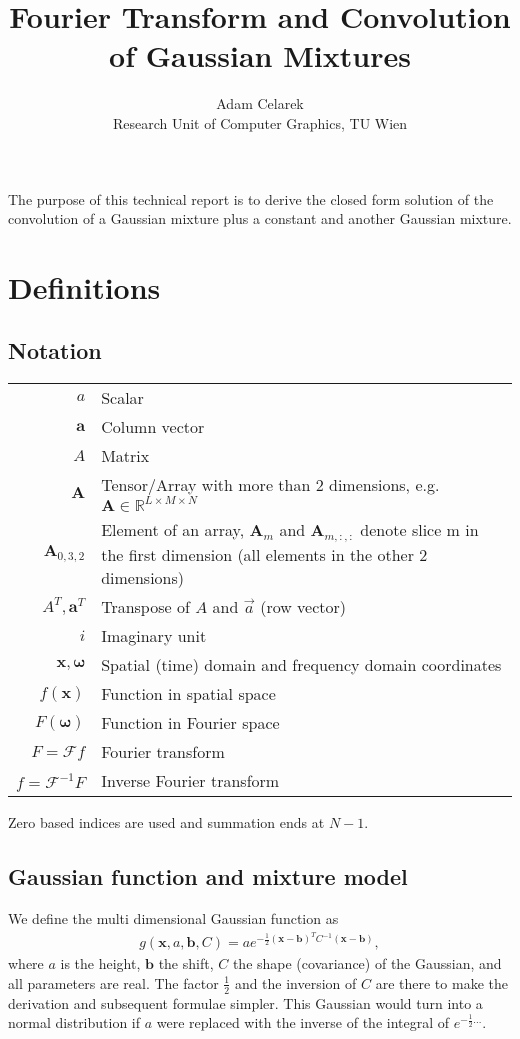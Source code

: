 \documentclass{paper}
\title{Fourier Transform and Convolution of Gaussian Mixtures}
\author{Adam Celarek\\Research Unit of Computer Graphics, TU Wien}
\newcommand{\F}{\ensuremath{\mathcal{F}}}
\newcommand{\vr}[1]{\ensuremath{\boldsymbol{#1}}}
\newcommand{\tr}[1]{\ensuremath{\boldsymbol{#1}}}
\newcommand{\f}[1]{#1}
\begin{document}
\maketitle


The purpose of this technical report is to derive the closed form solution of the convolution of a Gaussian mixture plus a constant and another Gaussian mixture.

\section{Definitions}
\subsection*{Notation}
\begin{center}
	\begin{supertabular}{rp{8cm}}
		$a$	& Scalar \\
		$\vr{a}$	& Column vector \\
		$A$			& Matrix \\ 
		$\tr{A}$	& Tensor/Array with more than 2 dimensions, e.g. $\tr{A} \in \mathbb{R}^{L \times M \times N}$ \\ 
		$\tr{A}_{0, 3, 2}$
					& Element of an array, $\tr{A}_{m}$ and $\tr{A}_{m, :, :}$ denote slice m in the first dimension (all elements in the other 2 dimensions)\\ 
		$A^T, \vr{a}^T$
					& Transpose of $A$ and $\vec{a}$ (row vector) \\
		$i$			& Imaginary unit \\
		$\vr{x}, \vr{\omega}$
					& Spatial (time) domain and frequency domain coordinates \\
		$\f{f}(\vr{x})$
					& Function in spatial space \\
		$\f{F}(\vr{\omega})$
					& Function in Fourier space \\
		$\f{F} = \F \f{f}$
					& Fourier transform \\
		$\f{f} = \F^{-1} \f{F}$
					& Inverse Fourier transform \\
	\end{supertabular}
\end{center}
Zero based indices are used and summation ends at $N-1$.

\subsection*{Gaussian function and mixture model}
We define the multi dimensional Gaussian function as
\begin{align}
\label{eq:gaussian_definition}
g(\vr{x}, a, \vr{b}, C) = a e^{-\frac{1}{2}(\vr{x}-\vr{b})^TC^{-1}(\vr{x}-\vr{b})},
\end{align}
where $a$ is the height, $\vr{b}$ the shift, $C$ the shape (covariance) of the Gaussian, and all parameters are real.
The factor $\frac{1}{2}$ and the inversion of $C$ are there to make the derivation and subsequent formulae simpler.
This Gaussian would turn into a normal distribution if $a$ were replaced with the inverse of the integral of $e^{-\frac{1}{2}...}$.
\end{document}
